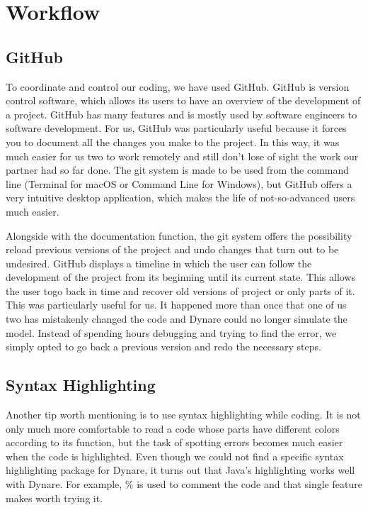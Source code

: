 \section{Workflow}

\subsection{GitHub}
\label{sub:GitHub}

To coordinate and control our coding, we have used GitHub. GitHub is version control software, which allows its users to have an overview of the development of a project. GitHub has many features and is mostly used by software engineers to software development. For us, GitHub was particularly useful because it forces you to document all the changes you make to the project. In this way, it was much easier for us two to work remotely and still don't lose of sight the work our partner had so far done. The git system is made to be used from the command line (Terminal for macOS or Command Line for Windows), but GitHub offers a very intuitive desktop application, which makes the life of not-so-advanced users much easier.

Alongside with the documentation function, the git system offers the possibility reload previous versions of the project and undo changes that turn out to be undesired. GitHub displays a timeline in which the user can follow the development of the project from its beginning until its current state. This allows the user togo back in time and recover old versions of project or only parts of it. This was particularly useful for us. It happened more than once that one of us two has mistakenly changed the code and Dynare could no longer simulate the model. Instead of spending hours debugging and trying to find the error, we simply opted to go back a previous version and redo the necessary steps.

\subsection{Syntax Highlighting}
\label{sub:Syntax Highlighting}

Another tip worth mentioning is to use syntax highlighting while coding. It is not only much more comfortable to read a code whose parts have different colors according to its function, but the task of spotting errors becomes much easier when the code is highlighted. Even though we could not find a specific syntax highlighting package for Dynare, it turns out that Java's highlighting works well with Dynare. For example, \% is used to comment the code and that single feature makes worth trying it.
